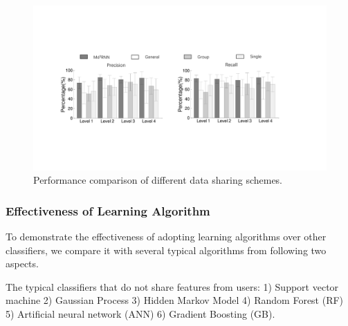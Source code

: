 

\begin{figure}[h]
  \centering
  \includegraphics[width=0.9\columnwidth]{./img/performance_of_multi_division.pdf}
  \caption{Performance comparison of different data sharing schemes.}
  \label{fig:cmp_multi_division}
\end{figure}


\subsubsection{Effectiveness of \modelname Learning Algorithm}
To demonstrate the effectiveness of adopting \modelname learning algorithms over other classifiers, we compare it with several typical algorithms from following  two aspects.

The typical classifiers that do not share features from users:  1) Support vector machine 2) Gaussian Process 3) Hidden Markov Model 4) Random Forest (RF) 5) Artificial neural network (ANN) 6) Gradient Boosting (GB).

